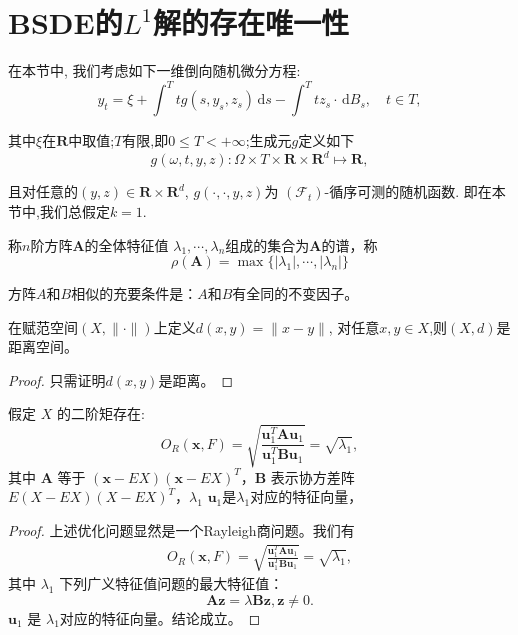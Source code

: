 \chapter{BSDE的$L^1$解的存在唯一性}\label{cha:FiniteTimeInterval}
在本节中, 我们考虑如下一维倒向随机微分方程:
\begin{equation}\label{eq:BSDEsInFiniteTimeInterval}
  y_t=\xi+\int^T{t} g(s,y_s,z_s)\,\mathrm{d}s-\int^T{t}z_s\cdot\,\mathrm{d}B_s,\quad t\in T,
\end{equation}

其中$\xi$在$\mathbf{R}$中取值;$T$有限,即$0\leq T<+\infty$;生成元$g$定义如下
\[g(\omega,t,y,z):\Omega\times T\times\mathbf{R}\times\mathbf{R}^d\mapsto \mathbf{R},\]

且对任意的$(y,z)\in\mathbf{R}\times\mathbf{R}^d$, $g(\cdot,\cdot,y,z)$为
$(\mathscr{F}_t)$-循序可测的随机函数. 即在本节中,我们总假定$k=1$.

\begin{definition}[谱半径]\label{def:def1}
称$n$阶方阵$\mathbf{A}$的全体特征值
$\lambda_1,\cdots,\lambda_n$组成的集合为$\mathbf{A}$的谱，称
$$\rho(\mathbf{A})=\max{\{|\lambda_1|,\cdots,|\lambda_n|\}}$$
\end{definition}
\begin{theorem}[相似充要条件]\label{lemma:l1}
方阵$A$和$B$相似的充要条件是：$A$和$B$有全同的不变因子。
\end{theorem}
\begin{corollary}[推论1]\label{cor:cor1}
在赋范空间$(X,\|\cdot\|)$上定义$d(x,y)=\|x-y\|$,
对任意$x,y\in X$,则$(X,d)$是距离空间。
\end{corollary}
\begin{proof}
只需证明$d(x,y)$是距离。
\end{proof}
\begin{theorem}
  \label{chapTSthm:rayleigh solution}
  假定 $X$ 的二阶矩存在:
  \begin{equation}
         O_R(\mathbf{x},F)=\sqrt{\frac{\mathbf{u}_1^T\mathbf{A}\mathbf{u}_1} {\mathbf{u}_1^T\mathbf{B}\mathbf{u}_1}}=\sqrt{\lambda_1},
  \end{equation}
  其中 $\mathbf{A}$ 等于 $(\mathbf{x}-EX)(\mathbf{x}-EX)^T$，$\mathbf{B}$ 表示协方差阵 $E(X-EX)(X-EX)^T$，$\lambda_1$
$\mathbf{u}_1$是$\lambda_1$对应的特征向量，
\end{theorem}
\begin{proof}
上述优化问题显然是一个Rayleigh商问题。我们有
  \begin{align}
     O_R(\mathbf{x},F)=\sqrt{\frac{\mathbf{u}_1^T\mathbf{A}\mathbf{u}_1} {\mathbf{u}_1^T\mathbf{B}\mathbf{u}_1}}=\sqrt{\lambda_1},
 \end{align}
 其中 $\lambda_1$ 下列广义特征值问题的最大特征值：
$$
\mathbf{A}\mathbf{z}=\lambda\mathbf{B}\mathbf{z}, \mathbf{z}\neq 0.
$$
 $\mathbf{u}_1$ 是 $\lambda_1$对应的特征向量。结论成立。
\end{proof}
